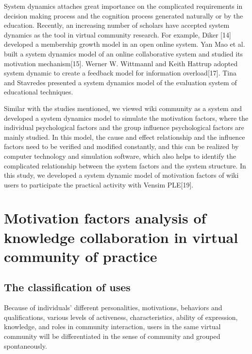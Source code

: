 \documentclass{elsarticle}
\begin{document}
System dynamics attaches great importance on the complicated requirements in decision making process and the cognition process generated naturally or by the education. Recently, an increasing number of scholars have accepted system dynamics as the tool in virtual community research. For example, Diker [14] developed a membership growth model in an open online system. Yan Mao et al. built a system dynamics model of an online collaborative system and studied its motivation mechanism[15]. Werner W. Wittmannl and Keith Hattrup adopted system dynamic to create a feedback model for information overload[17]. Tina and Stavredes presented a system dynamics model of the evaluation system of educational techniques. 

Similar with the studies mentioned, we viewed wiki community as a system and developed a system dynamics model to simulate the motivation factors, where the individual psychological factors and the group influence psychological factors are mainly studied. In this model, the cause and effect relationship and the influence factors need to be verified and modified constantly, and this can be realized by computer technology and simulation software, which also helps to identify the complicated relationship between the system factors and the system structure. In this study, we developed a system dynamic model of motivation factors of wiki users to participate the practical activity with Vensim PLE[19].

\section{Motivation factors analysis of knowledge collaboration in virtual community of practice}
\label{sec:motiv-fact-analys}

\subsection{The classification of uses}
\label{sec:classification-uses}

Because of individuals’ different personalities, motivations,
behaviors and qualifications, various levels of activeness,
characteristics, ability of expression, knowledge, and roles in
community interaction, users in the same virtual community will be
differentiated in the sense of community and grouped spontaneously. 
\end{document}
